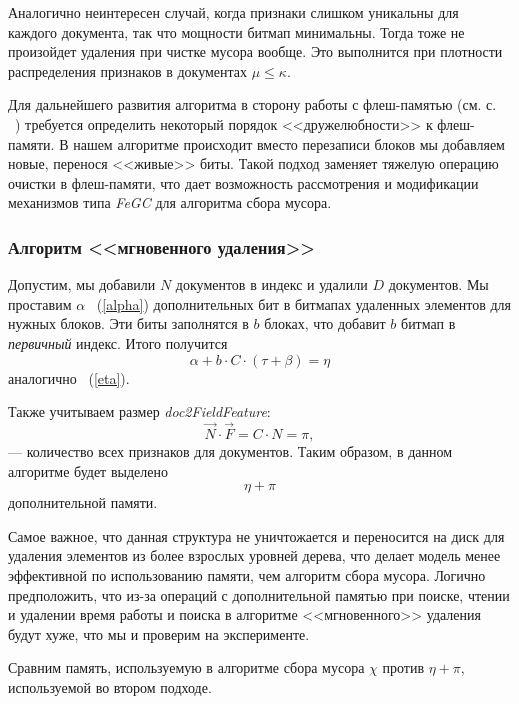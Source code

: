 Аналогично неинтересен случай, когда признаки слишком уникальны для каждого документа,
так что мощности битмап минимальны. Тогда тоже не произойдет удаления при чистке
мусора вообще. Это выполнится при плотности распределения признаков в документах
$\mu \leq \kappa$.

Для дальнейшего развития алгоритма в сторону работы с флеш-памятью (см. с.
~\pageref{FeGC}) требуется определить некоторый порядок <<дружелюбности>> к
флеш-памяти. В нашем алгоритме происходит вместо перезаписи блоков мы добавляем
новые, перенося <<живые>> биты. Такой подход заменяет тяжелую операцию очистки
в флеш-памяти, что дает возможность рассмотрения и модификации механизмов типа
\textit{FeGC} для алгоритма сбора мусора.

\subsubsection{Алгоритм <<мгновенного удаления>>}

Допустим, мы добавили $N$ документов в индекс и удалили $D$ документов. Мы
проставим $\alpha$ ~(\ref{alpha}) дополнительных бит в битмапах удаленных элементов для нужных блоков.
Эти биты заполнятся в $b$ блоках, что добавит $b$ битмап в \textit{первичный}
индекс. Итого получится
\begin{equation}
    \alpha + b \cdot C \cdot (\tau + \beta) = \eta
\end{equation}
аналогично ~(\ref{eta}).

Также учитываем размер \textit{doc2FieldFeature}: 
\begin{equation}
    \vec{N} \cdot \vec{F} = C \cdot N= \pi,
\end{equation}
— количество всех признаков для документов. Таким образом, в данном алгоритме будет выделено 
\begin{equation}
    \eta + \pi
\end{equation}
дополнительной памяти.

Самое важное, что данная структура не уничтожается и переносится на диск для
удаления элементов из более взрослых уровней дерева, что делает модель менее эффективной по
использованию памяти, чем алгоритм сбора мусора. Логично предположить, что из-за
операций с дополнительной памятью при поиске, чтении и удалении время работы и
поиска в алгоритме <<мгновенного>> удаления будут хуже, что мы и проверим на эксперименте.

Сравним память, используемую в алгоритме сбора мусора $\chi$ против $\eta + \pi$,
используемой во втором подходе.

